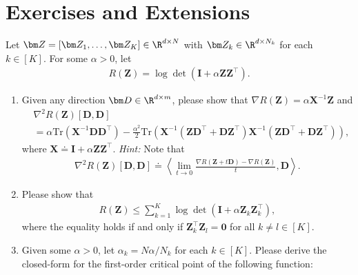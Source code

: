 \documentclass[../../book-main.tex]{subfiles}
\begin{document}
\section{Exercises and Extensions}

\begin{exercise}
    Let $\bm Z = [\bm Z_1,\dots,\bm Z_K] \in \R^{d\times N}$ with
    $\bm Z_k \in \R^{d\times N_k}$ for each $k \in [K]$. For some
    $\alpha > 0$, let
    \begin{align*}
        R(\bm Z) = \log\det\left(\bm I + \alpha\bm Z\bm Z^\top \right).
    \end{align*}
    \begin{enumerate}
        \item Given any direction $\bm D \in \R^{d\times m}$, please show
            that $\nabla R(\bm Z) = \alpha\bm X^{-1}\bm Z$ and
            \begin{align*}
                &\nabla^2 R(\bm Z)[\bm D, \bm D] \\
                &=\alpha \mathrm{Tr}\left( \bm
                X^{-1}\bm D\bm D^\top\right) -
                \frac{\alpha^2}{2}\mathrm{Tr}\left(\bm X^{-1}\left( \bm Z\bm
                    D^\top+\bm D\bm Z^\top\right) \bm X^{-1}\left(
                        \bm Z\bm D^\top+\bm
                D\bm Z^\top\right)\right),
            \end{align*}
            where $\bm X \doteq \bm I + \alpha\bm Z\bm Z^\top$. {\em
            Hint:} Note that
            \begin{align*}
                \nabla^2 R(\bm Z)[\bm D, \bm D] \doteq \left\langle \lim_{t
                \to 0} \frac{\nabla R(\bm Z+ t\bm D) - \nabla R(\bm Z)}{t},
                \bm D \right\rangle.
            \end{align*}
        \item
            Please show that
            \begin{align*}
                R(\bm Z) \le \sum_{k=1}^K \log\det\left(\bm I + \alpha\bm
                Z_k\bm Z_k^\top \right),
            \end{align*}
            where the equality holds if and only if $\bm Z_k^\top\bm Z_l = \bm
            0$ for all $k \neq l \in [K]$.
        \item Given some $\alpha >0$, let $\alpha_k=N\alpha/N_k$ for each $k
            \in [K]$. Please derive the closed-form for the first-order
            critical point of the following function:
            \begin{align*}

\end{align*}
\end{enumerate}
\end{exercise}
\end{document}
